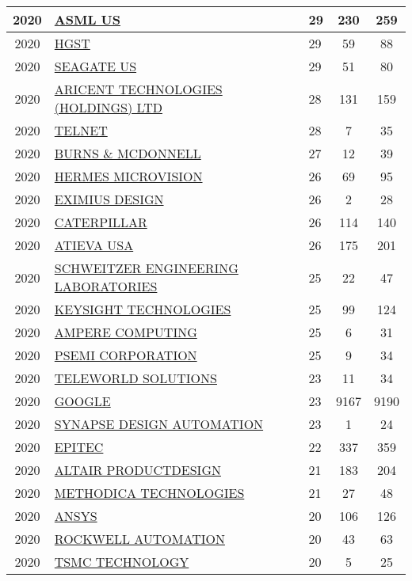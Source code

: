 \documentclass{article}%
\begin{document}
\begin{longtable}{c|p{20em}|p{5em}|c|c}
\hline%
2020&\hyperref[subsec:ASMLUS]{ASML US}&29&230&259\\%
\hline%
2020&\hyperref[subsec:HGST]{HGST}&29&59&88\\%
\hline%
2020&\hyperref[subsec:SEAGATEUS]{SEAGATE US}&29&51&80\\%
\hline%
2020&\hyperref[subsec:ARICENTTECHNOLOGIES(HOLDINGS)LTD]{ARICENT TECHNOLOGIES (HOLDINGS) LTD}&28&131&159\\%
\hline%
2020&\hyperref[subsec:TELNET]{TELNET}&28&7&35\\%
\hline%
2020&\hyperref[subsec:BURNSMCDONNELL]{BURNS \& MCDONNELL}&27&12&39\\%
\hline%
2020&\hyperref[subsec:HERMESMICROVISION]{HERMES MICROVISION}&26&69&95\\%
\hline%
2020&\hyperref[subsec:EXIMIUSDESIGN]{EXIMIUS DESIGN}&26&2&28\\%
\hline%
2020&\hyperref[subsec:CATERPILLAR]{CATERPILLAR}&26&114&140\\%
\hline%
2020&\hyperref[subsec:ATIEVAUSA]{ATIEVA USA}&26&175&201\\%
\hline%
2020&\hyperref[subsec:SCHWEITZERENGINEERINGLABORATORIES]{SCHWEITZER ENGINEERING LABORATORIES}&25&22&47\\%
\hline%
2020&\hyperref[subsec:KEYSIGHTTECHNOLOGIES]{KEYSIGHT TECHNOLOGIES}&25&99&124\\%
\hline%
2020&\hyperref[subsec:AMPERECOMPUTING]{AMPERE COMPUTING}&25&6&31\\%
\hline%
2020&\hyperref[subsec:PSEMICORPORATION]{PSEMI CORPORATION}&25&9&34\\%
\hline%
2020&\hyperref[subsec:TELEWORLDSOLUTIONS]{TELEWORLD SOLUTIONS}&23&11&34\\%
\hline%
2020&\hyperref[subsec:GOOGLE]{GOOGLE}&23&9167&9190\\%
\hline%
2020&\hyperref[subsec:SYNAPSEDESIGNAUTOMATION]{SYNAPSE DESIGN AUTOMATION}&23&1&24\\%
\hline%
2020&\hyperref[subsec:EPITEC]{EPITEC}&22&337&359\\%
\hline%
2020&\hyperref[subsec:ALTAIRPRODUCTDESIGN]{ALTAIR PRODUCTDESIGN}&21&183&204\\%
\hline%
2020&\hyperref[subsec:METHODICATECHNOLOGIES]{METHODICA TECHNOLOGIES}&21&27&48\\%
\hline%
2020&\hyperref[subsec:ANSYS]{ANSYS}&20&106&126\\%
\hline%
2020&\hyperref[subsec:ROCKWELLAUTOMATION]{ROCKWELL AUTOMATION}&20&43&63\\%
\hline%
2020&\hyperref[subsec:TSMCTECHNOLOGY]{TSMC TECHNOLOGY}&20&5&25\\%

\end{longtable}
\end{document}
